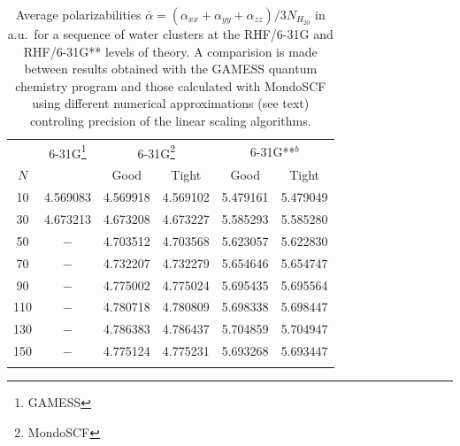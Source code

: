 \documentclass[prl,aps,twocolumn,showpacs,twocolumngrid,superbib]{revtex4}
\begin{document}
\begin{table}[t]
\caption{\protect Average polarizabilities $\bar{\alpha}=(\alpha_{xx}+\alpha_{yy}+\alpha_{zz})/3N_{H_20}$
         in a.u.~for a sequence of water clusters at the RHF/6-31G and RHF/6-31G** levels of theory.
         A comparision is made between results obtained with the GAMESS quantum chemistry program
         \cite{gamess} and those calculated with MondoSCF using different numerical approximations
         (see text) controling precision of the linear scaling algorithms.}\label{tab:Polari_Values}
\begin{tabular}{cccccc}
\toprule 
      &\multicolumn{1}{c}{6-31G\footnote[1]{GAMESS}}
      &\multicolumn{2}{c}{6-31G\footnote[2]{MondoSCF}}
      &\multicolumn{2}{c}{6-31G**$^b$}\\
      $N$ &          & Good     & Tight    &  Good    & Tight   \\
      \hline
      10  & 4.569083 & 4.569918 & 4.569102 & 5.479161 & 5.479049  \\
      30  & 4.673213 & 4.673208 & 4.673227 & 5.585293 & 5.585280  \\
      50  & $-$      & 4.703512 & 4.703568 & 5.623057 & 5.622830  \\
      70  & $-$      & 4.732207 & 4.732279 & 5.654646 & 5.654747  \\
      90  & $-$      & 4.775002 & 4.775024 & 5.695435 & 5.695564  \\
      110 & $-$      & 4.780718 & 4.780809 & 5.698338 & 5.698447  \\
      130 & $-$      & 4.786383 & 4.786437 & 5.704859 & 5.704947  \\
      150 & $-$      & 4.775124 & 4.775231 & 5.693268 & 5.693447  \\
\botrule
\end{tabular}
\end{table}
\end{document}
